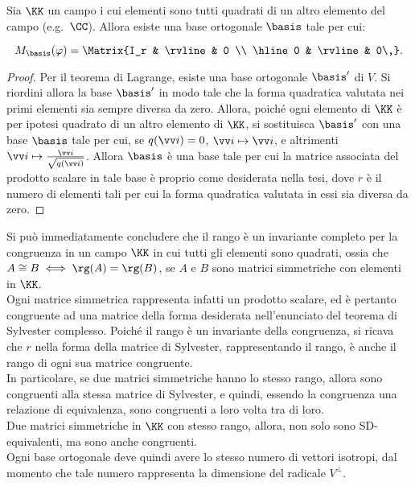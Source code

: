 \documentclass[11pt]{article}
\begin{document}
	\begin{theorem}
		Sia $\KK$ un campo i cui elementi sono tutti quadrati di un
		altro elemento del campo (e.g.~$\CC$). Allora esiste una base
		ortogonale $\basis$ tale per cui:
		
		\[ M_\basis(\varphi) = \Matrix{I_r & \rvline & 0 \\ \hline 0 & \rvline & 0\,}. \]
	\end{theorem}

	\begin{proof}
		Per il teorema di Lagrange, esiste una base ortogonale $\basis'$ di $V$.
		Si riordini allora la base $\basis'$ in modo tale che la forma quadratica valutata nei primi elementi sia sempre diversa da zero. Allora, poiché ogni
		elemento di $\KK$ è per ipotesi quadrato di un altro elemento
		di $\KK$, si sostituisca $\basis'$ con una base $\basis$ tale per
		cui, se $q(\vv i) = 0$, $\vv i \mapsto \vv i$, e altrimenti
		$\vv i \mapsto \frac{\vv i}{\sqrt{q(\vv i)}}$. Allora $\basis$
		è una base tale per cui la matrice associata del prodotto scalare
		in tale base è proprio come desiderata nella tesi, dove $r$ è
		il numero di elementi tali per cui la forma quadratica valutata
		in essi sia diversa da zero.
	\end{proof}

	\begin{remark}\nl
		\li Si può immediatamente concludere che il rango è un invariante
		completo per la congruenza in un campo $\KK$ in cui tutti gli elementi
		sono quadrati, ossia che $A \cong B \iff \rg(A) = \rg(B)$, se $A$ e
		$B$ sono matrici simmetriche con elementi in $\KK$. \\
		
		Ogni matrice simmetrica rappresenta infatti un prodotto scalare, ed è
		pertanto congruente ad una matrice della forma desiderata
		nell'enunciato del teorema di Sylvester complesso. Poiché il rango
		è un invariante della congruenza, si ricava che $r$ nella forma
		della matrice di Sylvester, rappresentando il rango, è anche
		il rango di ogni sua matrice congruente. \\
	
		In particolare, se due
		matrici simmetriche hanno lo stesso rango, allora sono congruenti
		alla stessa matrice di Sylvester, e quindi, essendo la congruenza
		una relazione di equivalenza, sono congruenti a loro volta tra di loro. \\

		\li Due matrici simmetriche in $\KK$ con stesso rango, allora, non solo
		sono SD-equivalenti, ma sono anche congruenti. \\

		\li Ogni base ortogonale deve quindi avere lo stesso numero
		di vettori isotropi, dal momento che tale numero rappresenta
		la dimensione del radicale $V^\perp$.
	\end{remark}
\end{document}
